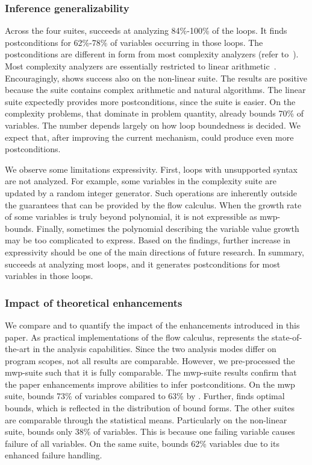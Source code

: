\subsubsection{Inference generalizability}
\label{subsec:rq1-res}

Across the four suites, \impl succeeds at analyzing 84\%-100\% of the loops.
It finds postconditions for 62\%-78\% of variables occurring in those loops.
The postconditions are different in form from most complexity analyzers (refer to~\cite{lommen2023,aubert2023b}).
Most complexity analyzers are essentially restricted to linear arithmetic~\cite{lommen2023}.
Encouragingly, \impl shows success also on the non-linear suite.
The results are positive because the suite contains complex arithmetic and natural algorithms.
The linear suite expectedly provides more postconditions, since the suite is easier.
On the complexity problems, that dominate in problem quantity, \impl already bounds 70\% of variables.
The number depends largely on how loop boundedness is decided.
We expect that, after improving the current mechanism, \impl could produce even more postconditions.

We observe some limitations \wrt expressivity.
First, loops with unsupported syntax are not analyzed.
For example, some variables in the complexity suite are updated by a random integer generator.
Such operations are inherently outside the guarantees that can be provided by the flow calculus.
When the growth rate of some variables is truly beyond polynomial, it is not expressible as mwp-bounds.
Finally, sometimes the polynomial describing the variable value growth may be too complicated to express.
Based on the findings, further increase in expressivity should be one of the main directions of future research.
In summary, \impl succeeds at analyzing most loops, and it generates postconditions for most variables in those loops.

\subsubsection{Impact of theoretical enhancements}\label{subsec:rq2-res}

We compare \impl and \impf to quantify the impact of the enhancements introduced in this paper.
As practical implementations of the flow calculus, \impf represents the state-of-the-art in the analysis capabilities.
Since the two analysis modes differ on program scopes, not all results are comparable.
However, we pre-processed the mwp-suite such that it is fully comparable.
The mwp-suite results confirm that the paper enhancements improve abilities to infer postconditions.
On the mwp suite, \impl bounds 73\% of variables compared to 63\% by \impf.
Further, \impl finds optimal bounds, which is reflected in the distribution of bound forms.
The other suites are comparable through the statistical means.
Particularly on the non-linear suite, \impf bounds only 38\% of variables.
This is because one failing variable causes failure of all variables.
On the same suite, \impl bounds 62\% variables due to its enhanced failure handling.

